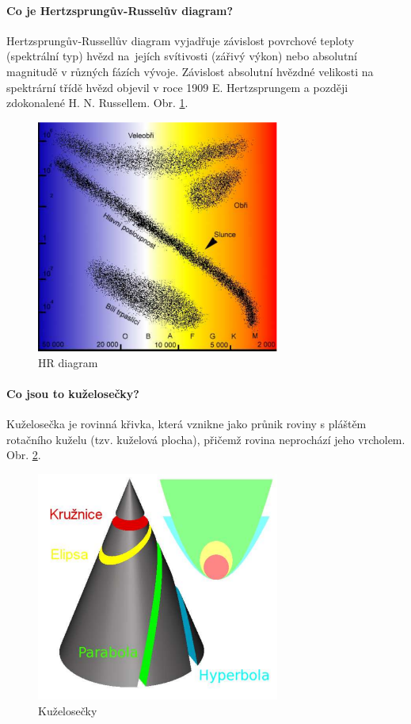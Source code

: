 \documentclass[11pt,a4paper,notitlepage]{article}
\begin{document}
\paragraph{Co je Hertzsprungův-Russelův diagram?}
Hertzsprungův-Russellův diagram vyjadřuje závislost povrchové teploty (spektrální typ) hvězd 
na~jejích svítivosti (zářivý výkon) nebo absolutní magnitudě v různých fázích vývoje. 
Závislost absolutní hvězdné velikosti na spektrární třídě hvězd objevil v roce 1909 E.
Hertzsprungem a později zdokonalené H. N. Russellem. Obr. \ref{HR_diagram}.
\begin{figure}[H]
\centering
\includegraphics[width=80mm]{HR_diagram}
\caption{HR diagram}
\label{HR_diagram}
\end{figure}
\paragraph{Co jsou to kuželosečky?}
Kuželosečka je rovinná křivka, která vznikne jako průnik roviny s pláštěm rotačního kuželu
(tzv. kuželová plocha), přičemž rovina neprochází jeho vrcholem. Obr. \ref{kuzelosecky}.
\begin{figure}[H]
\centering
\includegraphics[width=80mm]{kuzelosecky}
\caption{Kuželosečky}
\label{kuzelosecky}
\end{figure}
\end{document}
